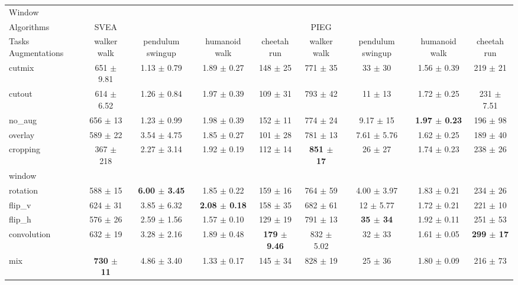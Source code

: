 \begin{tabular}{lcccccccc}
Window & & & & & & & & \\
Algorithms & SVEA & & & & PIEG & & & \\
Tasks Augmentations & walker walk & pendulum swingup & humanoid walk & cheetah run & walker walk & pendulum swingup & humanoid walk & cheetah run \\
cutmix          & 651 $\pm$ 9.81 & 1.13 $\pm$ 0.79 & 1.89 $\pm$ 0.27 & 148 $\pm$ 25 & 771 $\pm$ 35 & 33 $\pm$ 30 & 1.56 $\pm$ 0.39 & 219 $\pm$ 21 \\
cutout          & 614 $\pm$ 6.52 & 1.26 $\pm$ 0.84 & 1.97 $\pm$ 0.39 & 109 $\pm$ 31 & 793 $\pm$ 42 & 11 $\pm$ 13 & 1.72 $\pm$ 0.25 & 231 $\pm$ 7.51 \\
no\_aug         & 656 $\pm$ 13 & 1.23 $\pm$ 0.99 & 1.98 $\pm$ 0.39 & 152 $\pm$ 11 & 774 $\pm$ 24 & 9.17 $\pm$ 15 & \textbf{1.97 $\pm$ 0.23} & 196 $\pm$ 98 \\
overlay         & 589 $\pm$ 22 & 3.54 $\pm$ 4.75 & 1.85 $\pm$ 0.27 & 101 $\pm$ 28 & 781 $\pm$ 13 & 7.61 $\pm$ 5.76 & 1.62 $\pm$ 0.25 & 189 $\pm$ 40 \\
cropping        & 367 $\pm$ 218 & 2.27 $\pm$ 3.14 & 1.92 $\pm$ 0.19 & 112 $\pm$ 14 & \textbf{851 $\pm$ 17} & 26 $\pm$ 27 & 1.74 $\pm$ 0.23 & 238 $\pm$ 26 \\
window          &  &  &  &  &  &  &  &  \\
rotation        & 588 $\pm$ 15 & \textbf{6.00 $\pm$ 3.45} & 1.85 $\pm$ 0.22 & 159 $\pm$ 16 & 764 $\pm$ 59 & 4.00 $\pm$ 3.97 & 1.83 $\pm$ 0.21 & 234 $\pm$ 26 \\
flip\_v         & 624 $\pm$ 31 & 3.85 $\pm$ 6.32 & \textbf{2.08 $\pm$ 0.18} & 158 $\pm$ 35 & 682 $\pm$ 61 & 12 $\pm$ 5.77 & 1.72 $\pm$ 0.21 & 221 $\pm$ 10 \\
flip\_h         & 576 $\pm$ 26 & 2.59 $\pm$ 1.56 & 1.57 $\pm$ 0.10 & 129 $\pm$ 19 & 791 $\pm$ 13 & \textbf{35 $\pm$ 34} & 1.92 $\pm$ 0.11 & 251 $\pm$ 53 \\
convolution     & 632 $\pm$ 19 & 3.28 $\pm$ 2.16 & 1.89 $\pm$ 0.48 & \textbf{179 $\pm$ 9.46} & 832 $\pm$ 5.02 & 32 $\pm$ 33 & 1.61 $\pm$ 0.05 & \textbf{299 $\pm$ 17} \\
mix             & \textbf{730 $\pm$ 11} & 4.86 $\pm$ 3.40 & 1.33 $\pm$ 0.17 & 145 $\pm$ 34 & 828 $\pm$ 19 & 25 $\pm$ 36 & 1.80 $\pm$ 0.09 & 216 $\pm$ 73 \\
\end{tabular}